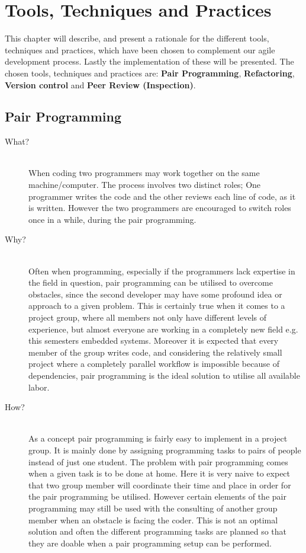 
\chapter{Tools, Techniques and Practices} %
\label{cha:tools_techniques_and_practices}
This chapter will describe, and present a rationale for the different tools, techniques and practices, which have been chosen to complement our agile development process.
Lastly the implementation of these will be presented.
The chosen tools, techniques and practices are: \textbf{Pair Programming}, \textbf{Refactoring}, \textbf{Version control} and \textbf{Peer Review (Inspection)}.

\section*{Pair Programming} %
\label{sec:pair_programming}
\begin{description}
    \item[What?]\hfill\\
    When coding two programmers may work together on the same machine/computer.
The process involves two distinct roles; One programmer writes the code and the other reviews each line of code, as it is written. 
However the two programmers are encouraged to switch roles once in a while, during the pair programming.
    
    \item[Why?]\hfill\\ 
    Often when programming, especially if the programmers lack expertise in the field in question, pair programming can be utilised to overcome obstacles, since the second developer may have some profound idea or approach to a given problem.
    This is certainly true when it comes to a project group, where all members not only have different levels of experience, but almost everyone are working in a completely new field e.g. this semesters embedded systems.
    Moreover it is expected that every member of the group writes code, and considering the relatively small project where a completely parallel workflow is impossible because of dependencies, pair programming is the ideal solution to utilise all available labor.
    
    \item[How?]\hfill\\
    As a concept pair programming is fairly easy to implement in a project group.
    It is mainly done by assigning programming tasks to pairs of people instead of just one student.
    The problem with pair programming comes when a given task is to be done at home.
    Here it is very naive to expect that two group member will coordinate their time and place in order for the pair programming be utilised.
    However certain elements of the pair programming may still be used with the consulting of another group member when an obstacle is facing the coder.
    This is not an optimal solution and often the different programming tasks are planned so that they are doable when a pair programming setup can be performed.
\end{description}
